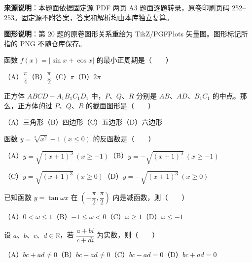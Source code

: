 


\begin{gktip}
\textbf{来源说明}：本题面依据固定源 PDF 两页 A3 题面逐题转录，原卷印刷页码 252–253。固定源不附答案，答案和解析均由本库独立复算。

\textbf{图形说明}：第 20 题的原卷图形关系重绘为 TikZ/PGFPlots 矢量图。图形标记所指的 PNG 不随仓库保存。
\end{gktip}


\begin{question}
函数 $f(x)=|\sin x+\cos x|$ 的最小正周期是\mbox{（　　）}

（A）$\dfrac{\pi}{4}$\quad（B）$\dfrac{\pi}{2}$\quad（C）$\pi$\quad（D）$2\pi$

\end{question}
\begin{question}
正方体 $ABCD-A_1B_1C_1D_1$ 中，$P\text{、}Q\text{、}R$ 分别是 $AB\text{、}AD\text{、}B_1C_1$ 的中点。那么，正方体的过 $P\text{、}Q\text{、}R$ 的截面图形是\mbox{（　　）}

（A）三角形\quad（B）四边形\quad（C）五边形\quad（D）六边形

\end{question}
\begin{question}
函数 $y=\sqrt[3]{x^2}-1\ (x\leqslant0)$ 的反函数是\mbox{（　　）}

（A）$y=\sqrt{(x+1)^3}\ (x\geqslant-1)$\quad（B）$y=-\sqrt{(x+1)^3}\ (x\geqslant-1)$

（C）$y=\sqrt{(x+1)^3}\ (x\geqslant0)$\quad（D）$y=-\sqrt{(x+1)^3}\ (x\geqslant0)$

\end{question}
\begin{question}
已知函数 $y=\tan\omega x$ 在 $\left(-\dfrac{\pi}{2},\dfrac{\pi}{2}\right)$ 内是减函数，则\mbox{（　　）}

（A）$0<\omega\leqslant1$\quad（B）$-1\leqslant\omega<0$\quad（C）$\omega\geqslant1$\quad（D）$\omega\leqslant-1$

\end{question}
\begin{question}
设 $a\text{、}b\text{、}c\text{、}d\in\mathbb R$，若 $\dfrac{a+bi}{c+di}$ 为实数，则\mbox{（　　）}

（A）$bc+ad\ne0$\quad（B）$bc-ad\ne0$\quad（C）$bc-ad=0$\quad（D）$bc+ad=0$

\end{question}
